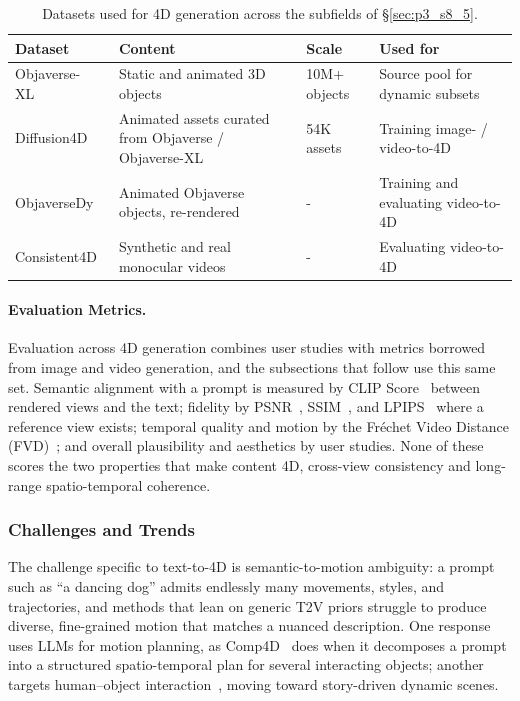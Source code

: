 \begin{table}[!ht]
\centering
\fontsize{8}{10}\selectfont
\setlength{\tabcolsep}{1.0mm}
\caption{Datasets used for 4D generation across the subfields of §\ref{sec:p3_s8_5}.}
\label{tab:4d_datasets}
\begin{tabular}{L{0.20\textwidth} L{0.24\textwidth} C{0.20\textwidth} L{0.26\textwidth}}
\toprule
\textbf{Dataset} & \textbf{Content} & \textbf{Scale} & \textbf{Used for} \\
\midrule
Objaverse-XL~\cite{deitke2023objaversexl} & Static and animated 3D objects & 10M+ objects & Source pool for dynamic subsets \\
Diffusion4D~\cite{liang2024diffusion4d} & Animated assets curated from Objaverse / Objaverse-XL & 54K assets & Training image- / video-to-4D \\
ObjaverseDy~\cite{xie2024sv4d} & Animated Objaverse objects, re-rendered & - & Training and evaluating video-to-4D \\
Consistent4D~\cite{jiang2023consistent4d} & Synthetic and real monocular videos & - & Evaluating video-to-4D \\
\bottomrule
\end{tabular}
\end{table}

\paragraph{Evaluation Metrics.} Evaluation across 4D generation combines user studies with metrics borrowed from image and video generation, and the subsections that follow use this same set. Semantic alignment with a prompt is measured by CLIP Score~\cite{radford2021learning} between rendered views and the text; fidelity by PSNR~\cite{hore2010image}, SSIM~\cite{wang2004image}, and LPIPS~\cite{zhang2018unreasonable} where a reference view exists; temporal quality and motion by the Fréchet Video Distance (FVD)~\cite{unterthiner2018fvd}; and overall plausibility and aesthetics by user studies. None of these scores the two properties that make content 4D, cross-view consistency and long-range spatio-temporal coherence.


\subsubsection{Challenges and Trends}
\label{subsubsec:p3_s8_5_1_challenges}
The challenge specific to text-to-4D is semantic-to-motion ambiguity: a prompt such as ``a dancing dog'' admits endlessly many movements, styles, and trajectories, and methods that lean on generic T2V priors struggle to produce diverse, fine-grained motion that matches a nuanced description.
One response uses LLMs for motion planning, as Comp4D~\cite{xu2024comp4d} does when it decomposes a prompt into a structured spatio-temporal plan for several interacting objects; another targets human--object interaction~\cite{cao2024avatargo}, moving toward story-driven dynamic scenes.

